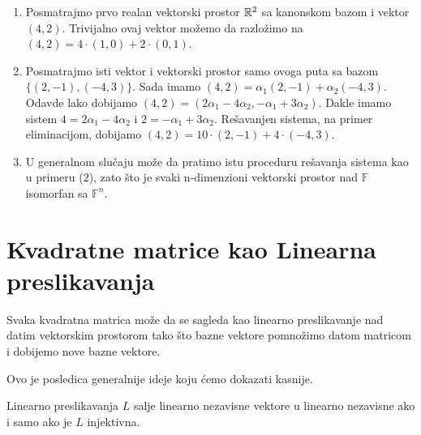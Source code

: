 \documentclass{article}
\begin{document}
\begin{example}
  \begin{enumerate}
    \item Posmatrajmo prvo realan vektorski prostor $\mathbb{R}^2$ sa kanonskom bazom i vektor $(4, 2)$.
      Trivijalno ovaj vektor možemo da razložimo na $(4, 2) = 4 \cdot (1, 0) + 2 \cdot (0, 1)$.
    \item Posmatrajmo isti vektor i vektorski prostor samo ovoga puta sa bazom $\{(2, -1), (-4, 3)\}$.
      Sada imamo $(4, 2) = \alpha_1 (2, -1) + \alpha_2 (-4, 3)$.
      Odavde lako dobijamo $(4, 2) = (2 \alpha_1 - 4 \alpha_2, -\alpha_1 + 3 \alpha_2)$.
      Dakle imamo sistem $4 = 2 \alpha_1 - 4 \alpha_2$ i $2 = -\alpha_1 + 3 \alpha_2$.
      Rešavanjen sistema, na primer eliminacijom, dobijamo $(4, 2) = 10 \cdot (2, -1) + 4 \cdot (-4, 3)$.
    \item U generalnom slučaju može da pratimo istu proceduru rešavanja sistema kao u primeru (2), zato što je svaki n-dimenzioni vektorski prostor nad $\mathbb{F}$ isomorfan sa $\mathbb{F}^n$.
  \end{enumerate}
\end{example}

\section{Kvadratne matrice kao Linearna preslikavanja}

\begin{theorem}
  Svaka kvadratna matrica može da se sagleda kao linearno preslikavanje nad datim vektorskim prostorom tako što bazne vektore pomnožimo datom matricom i dobijemo nove bazne vektore.
\end{theorem}

Ovo je posledica generalnije ideje koju ćemo dokazati kasnije.

\begin{theorem}
  Linearno preslikavanja $L$ salje linearno nezavisne vektore u linearno nezavisne ako i samo ako je $L$ injektivna.
\end{theorem}
\end{document}
